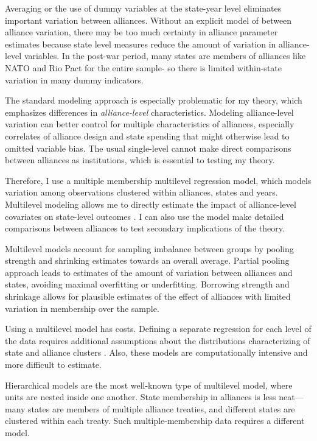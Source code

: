 \documentclass[12pt]{article}
\begin{document}
Averaging or the use of dummy variables at the state-year level eliminates important variation between alliances. Without an explicit model of between alliance variation, there may be too much certainty in alliance parameter estimates \citep{McElreath2016} because state level measures reduce the amount of variation in alliance-level variables. In the post-war period, many states are members of alliances like NATO and Rio Pact for the entire sample- so there is limited within-state variation in many dummy indicators. 

The standard modeling approach is especially problematic for my theory, which emphasizes differences in \textit{alliance-level} characteristics. Modeling alliance-level variation can better control for multiple characteristics of alliances, especially correlates of alliance design and state spending that might otherwise lead to omitted variable bias. The usual single-level cannot make direct comparisons between alliances as institutions, which is essential to testing my theory. 

Therefore, I use a multiple membership multilevel regression model, which models variation among observations clustered within alliances, states and years. Multilevel modeling allows me to directly estimate the impact of alliance-level covariates on state-level outcomes \citep{GelmanHill2007}. I can also use the model make detailed comparisons between alliances to test secondary implications of the theory. 

Multilevel models account for sampling imbalance between groups by pooling strength and shrinking estimates towards an overall average. Partial pooling approach leads to estimates of the amount of variation between alliances and states, avoiding maximal overfitting or underfitting. Borrowing strength and shrinkage allows for plausible estimates of the effect of alliances with limited variation in membership over the sample. 

Using a multilevel model has costs. Defining a separate regression for each level of the data requires additional assumptions about the distributions characterizing of state and alliance clusters \citep{McElreath2016}. Also, these models are computationally intensive and more difficult to estimate.

Hierarchical models are the most well-known type of multilevel model, where units are nested inside one another. State membership in alliances is less neat--- many states are members of multiple alliance treaties, and different states are clustered within each treaty. Such multiple-membership data requires a different model. 
\end{document}
